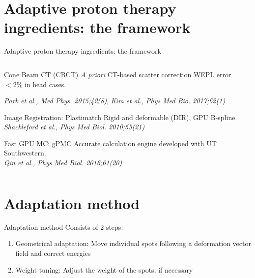 \documentclass[pdf,dvipsnames,aspectratio=169]{beamer}
\begin{document}
\section{Adaptive proton therapy ingredients: the framework}
\begin{frame}[c]{Adaptive proton therapy ingredients: the framework}
    \begin{columns}[c]
        \begin{column}{0.48\textwidth}
            \vspace*{-2mm}
            {
                \begin{block}{Cone Beam CT (CBCT)}
                    \textit{A priori} CT-based scatter correction WEPL error $< 2\%$ in head cases.\\
                    {\begin{flushright}\scriptsize\textit{Park et al., Med Phys. 2015;42(8)}, \textit{Kim et al., Phys Med Bio. 2017;62(1)}\end{flushright}}
                \end{block}}
            {
                \begin{block}{Image Registration: Plastimatch}
                    Rigid and deformable (DIR), GPU B-spline\\
                    {\hfill\scriptsize\textit{Shackleford et al., Phys Med Biol. 2010;55(21)}}
                \end{block}}
            {
                \begin{block}{Fast GPU MC: gPMC}
                    Accurate calculation engine developed with UT Southwestern.\\
                    {\hfill\scriptsize\textit{Qin et al., Phys Med Biol. 2016;61(20)}}
                \end{block}}
        \end{column}
        \begin{column}{0.5\textwidth}
            \centering
            \texttt{[image: \{imgs/drawing]}.pdf}
        \end{column}
    \end{columns}
\end{frame}

\section{Adaptation method}
\begin{frame}[c]{Adaptation method}
    Consists of 2 steps:
    \begin{enumerate}
        \item {\color{brandeisblue} Geometrical adaptation:} Move individual spots following a deformation vector field and correct energies
        \item {\color{brandeisblue} Weight tuning:} Adjust the weight of the spots, if necessary
    \end{enumerate}
\end{frame}
 
\end{document}
